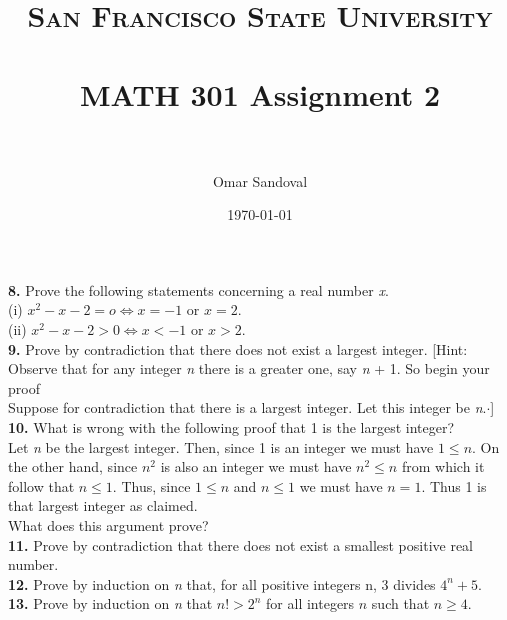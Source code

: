\documentclass[paper=letter, fontsize=11pt]{scrartcl} %
\title{	
\normalfont \normalsize 
\textsc{San Francisco State University} \\ [25pt]
\horrule{0.5pt} \\[0.4cm] %
\huge MATH 301 Assignment 2  \\ %
\horrule{2pt} \\[0.5cm] %
}
\author{Omar Sandoval}
\date{\normalsize\today}
\begin{document}
\maketitle

\textbf{8.} Prove the following statements concerning a real number \textit{x}. \\
(i) $x^2 - x - 2 = o \Leftrightarrow x = -1$ or $x = 2$.\\
(ii) $x^2 - x - 2 > 0 \Leftrightarrow x < -1$ or $x > 2$.
\\

\textbf{9.}	Prove by contradiction that there does not exist a largest integer. [Hint: Observe that for any integer \textit{n} there is a greater one, say \textit{n} + 1. So begin your proof  \\

Suppose for contradiction that there is a largest integer. Let this integer be \textit{n}.$ \cdot$]
\\

\textbf{10.} What is wrong with the following proof that 1 is the largest integer? \\

Let \textit{n} be the largest integer. Then, since 1 is an integer we must have $1 \le n$. On the other hand, since $n^2$ is also an integer we must have $n^2 \le n$ from which it follow that $n \le 1$. Thus, since $1 \le n$ and $n \le 1$ we must have $n = 1$. Thus 1 is that largest integer as claimed.
\\

What does this argument prove?
\\

\textbf{11.} Prove by contradiction that there does not exist a smallest positive real number.
\\

\textbf{12.} Prove by induction on \textit{n} that, for all positive integers n, 3 divides $4^n + 5$.
\\

\textbf{13.} Prove by induction on \textit{n} that $n! > 2^n$ for all integers $n$ such that $n \ge 4$.
\\
\end{document}
